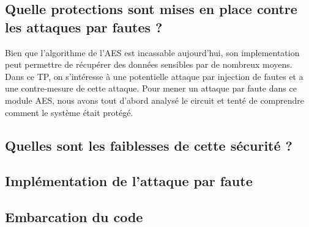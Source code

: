 \subsection{Quelle protections sont mises en place contre les attaques par fautes ?}

Bien que l'algorithme de l'AES est incassable aujourd'hui, son implementation peut permettre de récupérer des données sensibles par de nombreux moyens.
Dans ce TP, on s'intéresse à une potentielle attaque par injection de fautes et a une contre-mesure de cette attaque. 
Pour mener un attaque par faute  dans ce module AES, nous avons tout d'abord analysé le circuit et tenté de comprendre comment le système était protégé.


\subsection{Quelles sont les faiblesses de cette sécurité ?}

\subsection{Implémentation de l'attaque par faute}

\subsection{Embarcation du code}
